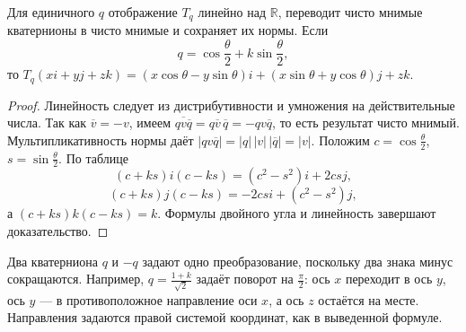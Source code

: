 \noindent\usebox{\CatFlowBox}\par\addvspace{5pt}
\begin{theorem}\label{thm:legacy-c24-4}
Для единичного \(q\) отображение \(T_q\) линейно над \(\mathbb R\), переводит чисто мнимые кватернионы в чисто мнимые и сохраняет их нормы. Если
\[
q=\cos\frac\theta2+k\sin\frac\theta2,
\]
то \(T_q(xi+yj+zk)=(x\cos\theta-y\sin\theta)i+(x\sin\theta+y\cos\theta)j+zk\).
\end{theorem}
\begin{proof}
Линейность следует из дистрибутивности и умножения на действительные числа. Так как \(\overline v=-v\), имеем \(\overline{qv\overline q}=q\overline v\,\overline q=-qv\overline q\), то есть результат чисто мнимый. Мультипликативность нормы даёт \(|qv\overline q|=|q|\,|v|\,|\overline q|=|v|\). Положим \(c=\cos\frac\theta2\), \(s=\sin\frac\theta2\). По таблице
\[
(c+ks)i(c-ks)=(c^2-s^2)i+2csj,
\]
\[
(c+ks)j(c-ks)=-2csi+(c^2-s^2)j,
\]
а \((c+ks)k(c-ks)=k\). Формулы двойного угла и линейность завершают доказательство.
\end{proof}
Два кватерниона \(q\) и \(-q\) задают одно преобразование, поскольку два знака минус сокращаются. Например, \(q=\frac{1+k}{\sqrt2}\) задаёт поворот на \(\frac\pi2\): ось \(x\) переходит в ось \(y\), ось \(y\) — в противоположное направление оси \(x\), а ось \(z\) остаётся на месте. Направления задаются правой системой координат, как в выведенной формуле.

